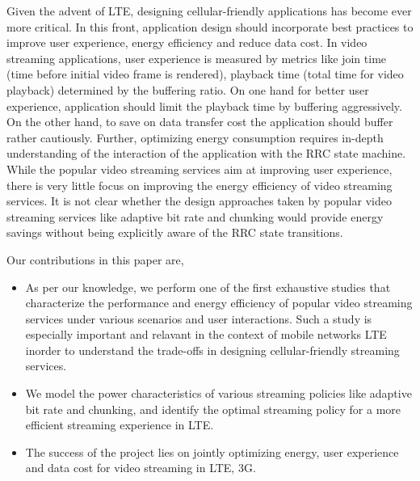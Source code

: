 Given the advent of LTE, designing cellular-friendly applications has become ever more critical. In this front, application design should incorporate best practices to improve user experience, energy efficiency and reduce data cost. In video streaming applications, user experience is measured by metrics like join time (time before initial video frame is rendered), playback time (total time for video playback) determined by the buffering ratio. On one hand for better user experience, application should limit the playback time by buffering aggressively. On the other hand, to save on data transfer cost the application should buffer rather cautiously. Further, optimizing energy consumption requires in-depth understanding of the interaction of the application with the RRC state machine. While the popular video streaming services aim at improving user experience, there is very little focus on improving the energy efficiency of video streaming services. It is not clear whether the design approaches taken by popular video streaming services like adaptive bit rate and chunking would provide energy savings without being explicitly aware of the RRC state transitions.           

Our contributions in this paper are,
\begin{itemize}
\item As per our knowledge, we perform one of the first exhaustive studies that characterize the performance and energy efficiency of popular video streaming services under various scenarios and user interactions.
Such a study is especially important and relavant in the context of mobile networks LTE inorder to understand the trade-offs in designing cellular-friendly streaming services. 
\item We model the power characteristics of various streaming policies like adaptive bit rate and chunking, and identify the optimal streaming policy for a more efficient streaming experience in LTE. 
\item 
The success of the project lies on jointly optimizing energy, user experience and data cost for video streaming in LTE, 3G.      
\end{itemize}
